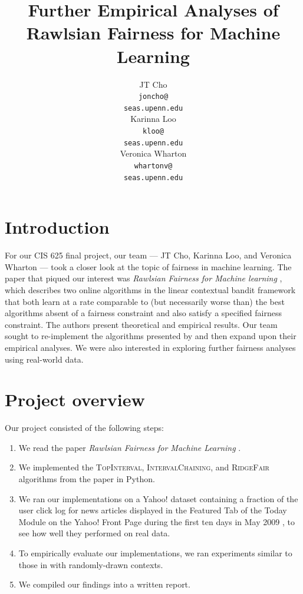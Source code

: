 \documentclass[11pt]{article}
\title{Further Empirical Analyses of Rawlsian Fairness for Machine Learning}
\author{JT Cho \\
	{\tt joncho@} \\
	{\tt seas.upenn.edu} \\\And
	Karinna Loo \\
	{\tt kloo@} \\
	{\tt seas.upenn.edu} \\\And
  	Veronica Wharton \\
  	{\tt whartonv@} \\
	{\tt seas.upenn.edu} }
\date{}
\begin{document}
\maketitle




\section{Introduction}

For our CIS 625 final project, our team --- JT Cho, Karinna Loo, and Veronica Wharton --- took a closer look at the topic of fairness in machine learning. The paper that piqued our interest was \textit{Rawlsian Fairness for Machine learning} \cite{DBLP:journals/corr/JosephKMNR16}, which describes two online algorithms in the linear contextual bandit framework that both learn at a rate comparable to (but necessarily worse than) the best algorithms absent of a fairness constraint and also satisfy a specified fairness constraint. The authors present theoretical and empirical results. Our team sought to re-implement the algorithms presented by  and then expand upon their empirical analyses. We were also interested in exploring further fairness analyses using real-world data.

\section{Project overview}

Our project consisted of the following steps:

\begin{enumerate}
	\item We read the paper \textit{Rawlsian Fairness for Machine Learning}  \cite{DBLP:journals/corr/JosephKMNR16}.
	\item We implemented the \textsc{TopInterval}, \textsc{IntervalChaining}, and \textsc{RidgeFair} algorithms from the paper in Python. 
	\item We ran our implementations on a Yahoo! dataset containing a fraction of the user click log for news articles displayed in the Featured Tab of the Today Module on the Yahoo! Front Page during the first ten days in May 2009 \cite{yahoo}, to see how well they performed on real data.
	\item To empirically evaluate our implementations, we ran experiments similar to those in \cite{DBLP:journals/corr/JosephKMNR16} with randomly-drawn contexts. 
	\item We compiled our findings into a written report.
\end{enumerate}
\end{document}
